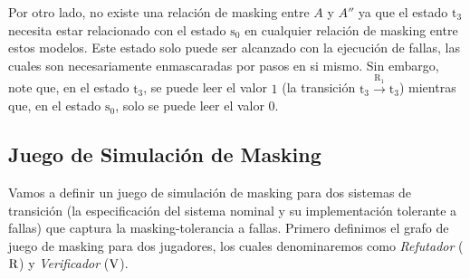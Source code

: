\begin{example}
Por otro lado, no existe una relación de masking entre $A$ y $A''$ ya que el estado $\text{t}_3$ necesita estar relacionado con el estado $\text{s}_0$ en cualquier relación de masking entre estos modelos. Este estado solo puede ser alcanzado con la ejecución de fallas, las cuales son necesariamente enmascaradas por pasos en si mismo. Sin embargo, note que, en el estado $\text{t}_3$, se puede leer el valor $1$ (la transición $\text{t}_3 \xrightarrow{\text{R}_1} \text{t}_3$) mientras que, en el estado $\text{s}_0$, solo se puede leer el valor $0$.
\end{example}
 
\subsection{Juego de Simulación de Masking} \label{subsec:mask_sim_game}
	Vamos a definir un juego de simulación de masking para dos sistemas de transición (la especificación del sistema nominal y su implementación tolerante a fallas) que captura la masking-tolerancia a fallas. Primero definimos el grafo de juego de masking para dos jugadores, los cuales denominaremos como \emph{Refutador} ($\mathrm{R}$) y \emph{Verificador}
($\mathrm{V}$).

